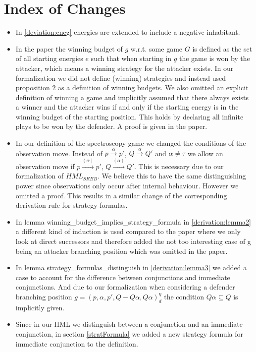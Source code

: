 \section{Index of Changes}
\begin{itemize}
    \item In \ref{deviation:eneg} energies are extended to include a negative inhabitant. 
    \item In the paper the winning budget of $g$ w.r.t. some game $G$ is defined as the set of all starting energies $e$ such that when starting in $g$ 
the game is won by the attacker, which means a winning strategy for the attacker exists. In our formalization we did not define (winning) strategies
and instead used proposition 2 as a definition of winning budgets. We also omitted an explicit definition of winning a game and implicitly assumed that there 
always exists a winner and the attacker wins if and only if the starting energy is in the winning budget of the starting position. This holds by declaring all
infinite plays to be won by the defender. A proof is given in the paper. 
    \item In our definition of the spectroscopy game we changed the conditions of the observation move. 
    Instead of $p \overset{\alpha}{\longrightarrow}p'$, $Q \overset{\alpha}{\longrightarrow} Q'$ and $\alpha \neq \tau$
    we allow an observation move if  $p \overset{(\alpha)}{\longrightarrow}p'$, $Q \overset{(\alpha)}{\longrightarrow} Q'$.
    This is necessary due to our formalization of $HML_{SRBB}$. We believe this to have the same distinguishing power 
    since observations only occur after internal behaviour. However we omitted a proof. 
    This results in a similar change of the corresponding derivation rule for strategy formulas.
    \item In lemma winning\_budget\_implies\_strategy\_formula in \ref{derivation:lemma2} a different kind of induction is used compared to the paper 
    where we only look at direct successors and therefore added the not too interesting case of g being an 
    attacker branching position which was omitted in the paper.
   \item In lemma strategy\_formulas\_distinguish in  \ref{derivation:lemma3} we added a case to account for the difference between 
conjunctions and immediate conjunctions. And due to our formalization when considering a
defender branching position $g=(p,\alpha ,p', Q - Q\alpha, Q\alpha)_d^\eta$ the condition 
$Q \alpha \subseteq Q$ is implicitly given.
  \item Since in our HML we distinguish between a conjunction and an immediate conjunction, in section \ref{stratFormula} 
we added a new strategy formula for immediate conjunction to the definition.
\end{itemize}

